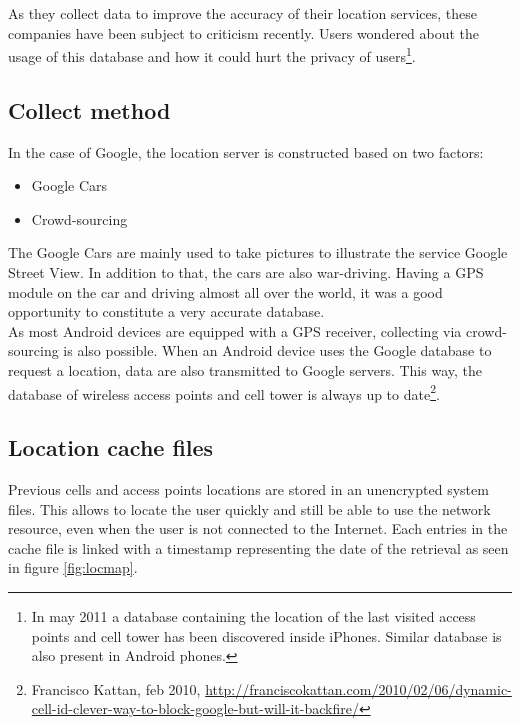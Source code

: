 As they collect data to improve the accuracy of their location services, these companies have been subject to criticism recently.
Users wondered about the usage of this database and how it could hurt the privacy of users\footnote{In may 2011 a database containing the location of the last visited access points and cell tower has been discovered inside iPhones. Similar database is also present in Android phones.}.

\subsection{Collect method}
In the case of Google, the location server is constructed based on two factors:
\begin{itemize}
\item Google Cars
\item Crowd-sourcing
\end{itemize}

The Google Cars are mainly used to take pictures to illustrate the service Google Street View.
In addition to that, the cars are also war-driving.
Having a GPS module on the car and driving almost all over the world, it was a good opportunity to constitute a very accurate database.\\

As most Android devices are equipped with a GPS receiver, collecting via crowd-sourcing is also possible.
When an Android device uses the Google database to request a location, data are also transmitted to Google servers.
This way, the database of wireless access points and cell tower is always up to date\footnote{Francisco Kattan, feb 2010, \url{http://franciscokattan.com/2010/02/06/dynamic-cell-id-clever-way-to-block-google-but-will-it-backfire/}}.

\subsection{Location cache files}

Previous cells and access points locations are stored in an unencrypted system files.
This allows to locate the user quickly and still be able to use the network resource, even when the user is not connected to the Internet.
Each entries in the cache file is linked with a timestamp representing the date of the retrieval as seen in figure \ref{fig:locmap}.\\

